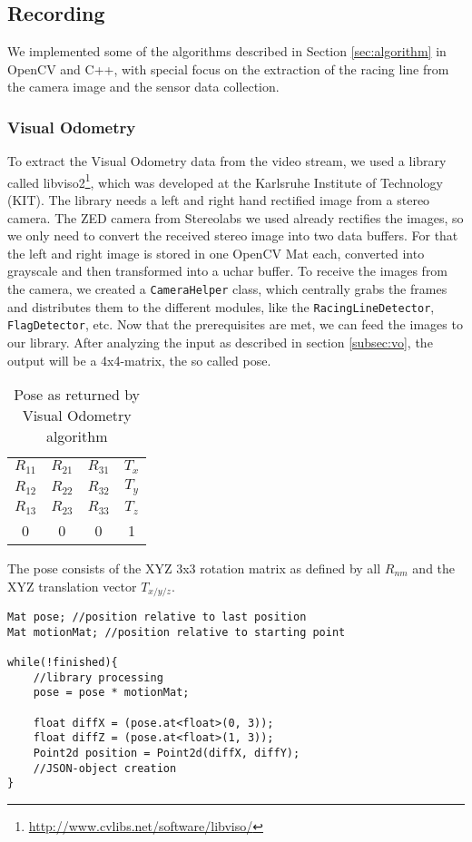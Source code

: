 \subsection{Recording}
We implemented some of the algorithms described in Section \ref{sec:algorithm} in OpenCV and C++, with special focus on the extraction of the racing line from the camera image and the sensor data collection.

\subsubsection{Visual Odometry}
To extract the Visual Odometry data from the video stream, we used a library called libviso2\footnote{\url{http://www.cvlibs.net/software/libviso/}}, which was developed at the Karlsruhe Institute of Technology (KIT). The library needs a left and right hand rectified image from a stereo camera. The ZED camera from Stereolabs we used already rectifies the images, so we only need to convert the received stereo image into two data buffers.
For that the left and right image is stored in one OpenCV Mat each, converted into grayscale and then transformed into a uchar buffer.
To receive the images from the camera, we created a \texttt{CameraHelper} class, which centrally grabs the frames and distributes them to the different modules, like the \texttt{RacingLineDetector}, \texttt{FlagDetector}, etc.
Now that the prerequisites are met, we can feed the images to our library.
After analyzing the input as described in section \ref{subsec:vo}, the output will be a 4x4-matrix, the so called pose.

\begin{table}[!ht]
 \begin{center}
  \begin{tabular}{c c c c}
   $R_{11}$ & $R_{21}$ & $R_{31}$ & $T_{x}$\\
   $R_{12}$ & $R_{22}$ & $R_{32}$ & $T_{y}$\\
   $R_{13}$ & $R_{23}$ & $R_{33}$ & $T_{z}$\\
   0 & 0 & 0 & 1
  \end{tabular}
 \end{center}
 \caption{Pose as returned by Visual Odometry algorithm}
\end{table}

The pose consists of the XYZ 3x3 rotation matrix as defined by all $R_{nm}$ and the XYZ translation vector $T_{x/y/z}$. 

\begin{lstlisting}
Mat pose; //position relative to last position
Mat motionMat; //position relative to starting point

while(!finished){
	//library processing
	pose = pose * motionMat;

	float diffX = (pose.at<float>(0, 3));
	float diffZ = (pose.at<float>(1, 3));
	Point2d position = Point2d(diffX, diffY);
	//JSON-object creation 
}
\end{lstlisting}

